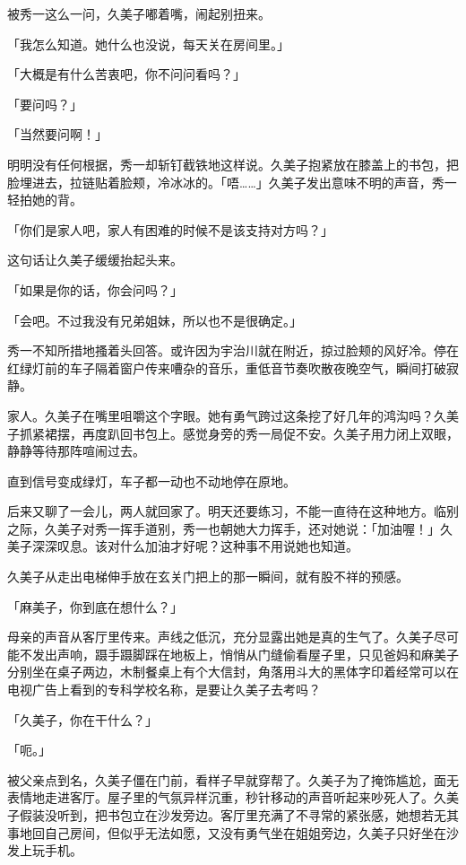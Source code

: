 \documentclass[UTF8]{ctexart}
\begin{document}
    被秀一这么一问，久美子嘟着嘴，闹起别扭来。 

    「我怎么知道。她什么也没说，每天关在房间里。」 

    「大概是有什么苦衷吧，你不问问看吗？」 

    「要问吗？」 

    「当然要问啊！」 

    明明没有任何根据，秀一却斩钉截铁地这样说。久美子抱紧放在膝盖上的书包，把脸埋进去，拉链贴着脸颊，冷冰冰的。「唔……」久美子发出意味不明的声音，秀一轻拍她的背。 

    「你们是家人吧，家人有困难的时候不是该支持对方吗？」 

    这句话让久美子缓缓抬起头来。 

    「如果是你的话，你会问吗？」 

    「会吧。不过我没有兄弟姐妹，所以也不是很确定。」 

    秀一不知所措地搔着头回答。或许因为宇治川就在附近，掠过脸颊的风好冷。停在红绿灯前的车子隔着窗户传来嘈杂的音乐，重低音节奏吹散夜晚空气，瞬间打破寂静。 

    家人。久美子在嘴里咀嚼这个字眼。她有勇气跨过这条挖了好几年的鸿沟吗？久美子抓紧裙摆，再度趴回书包上。感觉身旁的秀一局促不安。久美子用力闭上双眼，静静等待那阵喧闹过去。 

    直到信号变成绿灯，车子都一动也不动地停在原地。 

    后来又聊了一会儿，两人就回家了。明天还要练习，不能一直待在这种地方。临别之际，久美子对秀一挥手道别，秀一也朝她大力挥手，还对她说：「加油喔！」久美子深深叹息。该对什么加油才好呢？这种事不用说她也知道。 

    久美子从走出电梯伸手放在玄关门把上的那一瞬间，就有股不祥的预感。 

    「麻美子，你到底在想什么？」 

    母亲的声音从客厅里传来。声线之低沉，充分显露出她是真的生气了。久美子尽可能不发出声响，蹑手蹑脚踩在地板上，悄悄从门缝偷看屋子里，只见爸妈和麻美子分别坐在桌子两边，木制餐桌上有个大信封，角落用斗大的黑体字印着经常可以在电视广告上看到的专科学校名称，是要让久美子去考吗？ 

    「久美子，你在干什么？」 

    「呃。」 

    被父亲点到名，久美子僵在门前，看样子早就穿帮了。久美子为了掩饰尴尬，面无表情地走进客厅。屋子里的气氛异样沉重，秒针移动的声音听起来吵死人了。久美子假装没听到，把书包立在沙发旁边。客厅里充满了不寻常的紧张感，她想若无其事地回自己房间，但似乎无法如愿，又没有勇气坐在姐姐旁边，久美子只好坐在沙发上玩手机。 
\end{document}
